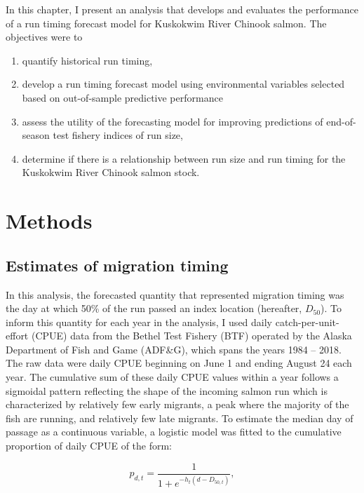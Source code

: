 \documentclass[12pt,]{book}
\providecommand{\tightlist}{%
  \setlength{\itemsep}{0pt}\setlength{\parskip}{0pt}}
\theoremstyle{definition}
\theoremstyle{definition}
\theoremstyle{definition}
\theoremstyle{remark}
\begin{document}
In this chapter, I present an analysis that develops and evaluates the
performance of a run timing forecast model for Kuskokwim River Chinook
salmon. The objectives were to

\begin{enumerate}
\def\labelenumi{(\arabic{enumi})}
\tightlist
\item
  quantify historical run timing,
\item
  develop a run timing forecast model using environmental variables
  selected based on out-of-sample predictive performance
\item
  assess the utility of the forecasting model for improving predictions
  of end-of-season test fishery indices of run size,
\item
  determine if there is a relationship between run size and run timing
  for the Kuskokwim River Chinook salmon stock.
\end{enumerate}

\section{Methods}\label{methods}

\subsection{Estimates of migration
timing}\label{estimates-of-migration-timing}

\noindent
In this analysis, the forecasted quantity that represented migration
timing was the day at which 50\% of the run passed an index location
(hereafter, \(D_{50}\)). To inform this quantity for each year in the
analysis, I used daily catch-per-unit-effort (CPUE) data from the Bethel
Test Fishery (BTF) operated by the Alaska Department of Fish and Game
(ADF\&G), which spans the years 1984 -- 2018. The raw data were daily
CPUE beginning on June 1 and ending August 24 each year. The cumulative
sum of these daily CPUE values within a year follows a sigmoidal pattern
reflecting the shape of the incoming salmon run which is characterized
by relatively few early migrants, a peak where the majority of the fish
are running, and relatively few late migrants. To estimate the median
day of passage as a continuous variable, a logistic model was fitted to
the cumulative proportion of daily CPUE of the form:

\begin{equation}
  p_{d,t}=\frac{1}{1 + e^{-h_t (d - D_{50,t})}},
  \label{eq:logistic}
\end{equation}
\end{document}
